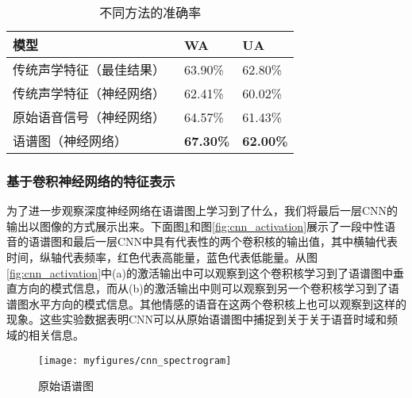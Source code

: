 \begin{table}[htb]
\centering
\begin{minipage}[t]{1.0\linewidth} %
\caption{不同方法的准确率}
\label{tab:acc_end2end}
    \begin{tabularx}{\linewidth}{X<{\centering} X<{\centering} X<{\centering}}
        \toprule[1.5pt]
        模型 & WA & UA \\
        \midrule[1pt]
        传统声学特征（最佳结果）~\cite{Lee2015High} & 63.90\% & 62.80\% \\
        传统声学特征（神经网络） & 62.41\% & 60.02\% \\
        原始语音信号（神经网络） & 64.57\% & 61.43\% \\
        语谱图（神经网络） & \textbf{67.30\%} & \textbf{62.00\%} \\
        \bottomrule[1.5pt]
    \end{tabularx}
\end{minipage}
\end{table}

\subsubsection{基于卷积神经网络的特征表示}
\label{sssec:end2end_cnn_feature}

为了进一步观察深度神经网络在语谱图上学习到了什么，我们将最后一层CNN的输出以图像的方式展示出来。下面图\ref{fig:cnn_spectrogram}和图\ref{fig:cnn_activation}展示了一段中性语音的语谱图和最后一层CNN中具有代表性的两个卷积核的输出值，其中横轴代表时间，纵轴代表频率，红色代表高能量，蓝色代表低能量。从图\ref{fig:cnn_activation}中(a)的激活输出中可以观察到这个卷积核学习到了语谱图中垂直方向的模式信息，而从(b)的激活输出中则可以观察到另一个卷积核学习到了语谱图水平方向的模式信息。其他情感的语音在这两个卷积核上也可以观察到这样的现象。这些实验数据表明CNN可以从原始语谱图中捕捉到关于关于语音时域和频域的相关信息。

\begin{figure}[htb] %
    \vspace{-0cm}  %
    \setlength{\belowcaptionskip}{0cm}   %
    \centering
    \texttt{[image: myfigures/cnn\_spectrogram]}
    \caption{原始语谱图}
    \label{fig:cnn_spectrogram}
\end{figure}

